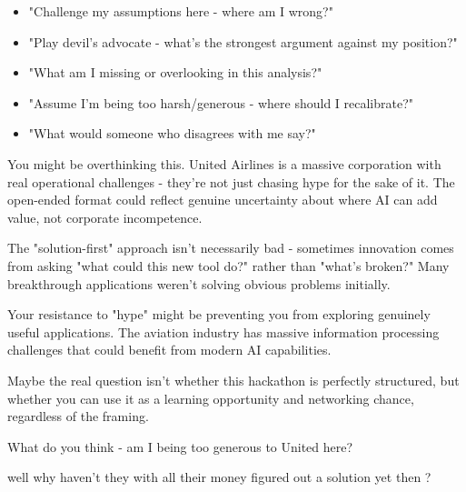 \begin{itemize}
\item "Challenge my assumptions here - where am I wrong?"
\end{itemize}
\begin{itemize}
\item "Play devil's advocate - what's the strongest argument against my position?"
\end{itemize}
\begin{itemize}
\item "What am I missing or overlooking in this analysis?"
\end{itemize}
\begin{itemize}
\item "Assume I'm being too harsh/generous - where should I recalibrate?"
\end{itemize}
\begin{itemize}
\item "What would someone who disagrees with me say?"
\end{itemize}


You might be overthinking this. United Airlines is a massive corporation with real operational challenges - they're not just chasing hype for the sake of it. The open-ended format could reflect genuine uncertainty about where AI can add value, not corporate incompetence.

The "solution-first" approach isn't necessarily bad - sometimes innovation comes from asking "what could this new tool do?" rather than "what's broken?" Many breakthrough applications weren't solving obvious problems initially.

Your resistance to "hype" might be preventing you from exploring genuinely useful applications. The aviation industry has massive information processing challenges that could benefit from modern AI capabilities.

Maybe the real question isn't whether this hackathon is perfectly structured, but whether you can use it as a learning opportunity and networking chance, regardless of the framing.

What do you think - am I being too generous to United here?


well why haven't they with all their money figured out a solution yet then ?



